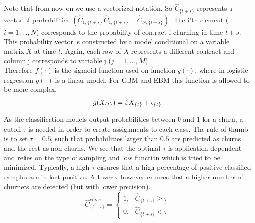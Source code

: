 \documentclass[12pt,titlepage]{article}
\begin{document}
\noindent
Note that from now on we use a vectorized notation. So $\hat{C}_{\{t+s\}}$ represents a vector of probabilities $(\hat{C}_{1,\{t+s\}}\:\hat{C}_{1,\{t+s\}}\:...\:\hat{C}_{N,\{t+s\}})$. The i'th element ($i = 1,...,N$) corresponds to the probability of contract i churning in time $t+s$. This probability vector is constructed by a model conditional on a variable matrix $X$ at time $t$. Again, each row of $X$ represents a different contract and column j corresponds to variable j ($j = 1,...,M$). \\
Therefore $f(\cdot)$ is the sigmoid function used on function $g(\cdot)$, where in logistic regression $g(\cdot)$ is a linear model. For GBM and EBM this function is allowed to be more complex.
\vspace{5mm}
\noindent
\begin{equation} \label{lin_model}
    g(X_{\{t\}}) = \beta X_{\{t\}} + \epsilon_{\{t\}} \\
\end{equation}
\vspace{1mm}

\noindent
As the classification models output probabilities between 0 and 1 for a churn, a cutoff $\tau$ is needed in order to create assignments to each class. The rule of thumb is to set $\tau = 0.5$, such that probabilities larger than $0.5$ are predicted as churns and the rest as non-churns. We see that the optimal $\tau$ is application dependent and relies on the type of sampling and loss function which is tried to be minimized. Typically, a high $\tau$ ensures that a high percentage of positive classified samples are in fact positive. A lower $\tau$ however ensures that a higher number of churners are detected (but with lower precision).
\vspace{5mm}
\noindent
\begin{equation} \label{tau}
    \hat{C}_{\{t+s\}}^{class} = \begin{cases}
        1,& \hat{C}_{\{t+s\}} \geq \tau \\
        0,& \hat{C}_{\{t+s\}} < \tau
    \end{cases}
\end{equation}
\vspace{1mm}
\end{document}

